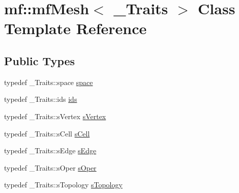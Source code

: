 \hypertarget{classmf_1_1mfMesh}{
\section{mf::mfMesh$<$ \_\-Traits $>$ Class Template Reference}
\label{classmf_1_1mfMesh}
}
\subsection*{Public Types}
\begin{DoxyCompactItemize}
\item 
typedef \_\-Traits::space \hyperlink{classmf_1_1mfMesh_a6934f60ee28bc351e8a9b4cb0d80c3c9}{space}
\item 
typedef \_\-Traits::ids \hyperlink{classmf_1_1mfMesh_a1341cfb4c31ef50c2cb5697b21b4b80e}{ids}
\item 
typedef \_\-Traits::sVertex \hyperlink{classmf_1_1mfMesh_a4035130c7a264094e6a111cada08728a}{sVertex}
\item 
typedef \_\-Traits::sCell \hyperlink{classmf_1_1mfMesh_aef12414d31f355d46ead5ee4e6168048}{sCell}
\item 
typedef \_\-Traits::sEdge \hyperlink{classmf_1_1mfMesh_a08b83de804f35261894bab4088146d0b}{sEdge}
\item 
typedef \_\-Traits::sOper \hyperlink{classmf_1_1mfMesh_ae5b6aa5ab4aa760861b9b5e26853d9d9}{sOper}
\item 
typedef \_\-Traits::sTopology \hyperlink{classmf_1_1mfMesh_ae6d458aa161b03c40801544ecd31ff1b}{sTopology}
\end{DoxyCompactItemize}
